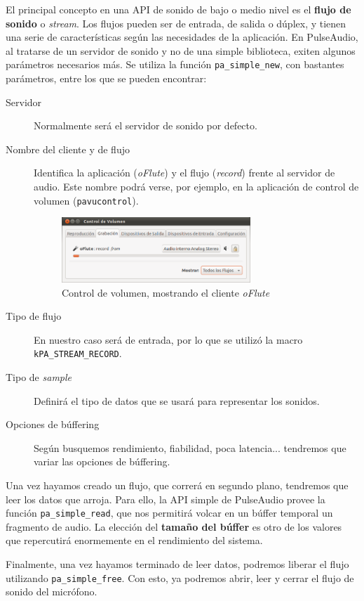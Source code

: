 El principal concepto en una API de sonido de bajo o medio nivel es el
\textbf{flujo de sonido} o \textit{stream}. Los flujos pueden ser de entrada, de
salida o dúplex, y tienen una serie de características según las necesidades de
la aplicación. En PulseAudio, al tratarse de un servidor de sonido y no de una
simple biblioteca, exiten algunos parámetros necesarios más. Se utiliza la
función \texttt{pa\_simple\_new}, con bastantes parámetros, entre los que se
pueden encontrar:
\begin{description}
\item[Servidor] Normalmente será el servidor de sonido por defecto.
\item[Nombre del cliente y de flujo] Identifica la aplicación (\textit{oFlute})
  y el flujo (\textit{record}) frente al servidor de audio. Este nombre podrá
  verse, por ejemplo, en la aplicación de control de volumen
  (\texttt{pavucontrol}).
  \begin{figure}[ht!]
    \centering
    \includegraphics[width=0.7\textwidth]{6_implementacion/imagen_pavucontrol}
    \caption{Control de volumen, mostrando el cliente \textit{oFlute}}
  \end{figure}
\item[Tipo de flujo] En nuestro caso será de entrada, por lo que se utilizó la
  macro \texttt{\nohyphens{kPA\_STREAM\_RECORD}}.
\item[Tipo de \textit{sample}] Definirá el tipo de datos que se usará para
  representar los sonidos.
\item[Opciones de búffering] Según busquemos rendimiento, fiabilidad, poca
  latencia... tendremos que variar las opciones de búffering.
\end{description}

Una vez hayamos creado un flujo, que correrá en segundo plano, tendremos que
leer los datos que arroja. Para ello, la API simple de PulseAudio provee la
función \texttt{pa\_simple\_read}, que nos permitirá volcar en un búffer
temporal un fragmento de audio. La elección del \textbf{tamaño del búffer} es
otro de los valores que repercutirá enormemente en el rendimiento del sistema.

Finalmente, una vez hayamos terminado de leer datos, podremos liberar el flujo
utilizando \texttt{pa\_simple\_free}. Con esto, ya podremos abrir, leer y cerrar
el flujo de sonido del micrófono. 

